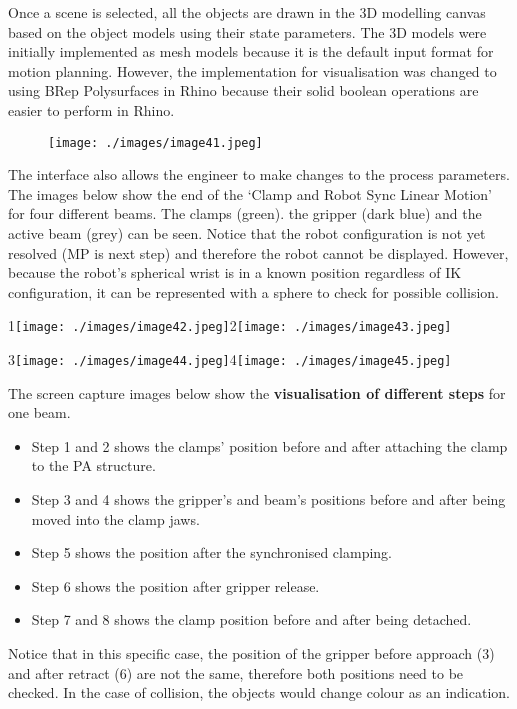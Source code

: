 Once a scene is selected, all the objects are drawn in the 3D modelling canvas based on the object models using their state parameters. The 3D models were initially implemented as mesh models because it is the default input format for motion planning. However, the implementation for visualisation was changed to using BRep Polysurfaces in Rhino because their solid boolean operations are easier to perform in Rhino. 

\begin{figure}[H]
\texttt{[image: ./images/image41.jpeg]}
\end{figure}



The interface also allows the engineer to make changes to the process parameters. The images below show the end of the ‘Clamp and Robot Sync Linear Motion’ for four different beams. The clamps (green). the gripper (dark blue) and the active beam (grey) can be seen. Notice that the robot configuration is not yet resolved (MP is next step) and therefore the robot cannot be displayed. However, because the robot’s spherical wrist is in a known position regardless of IK configuration, it can be represented with a sphere to check for possible collision.

{\small 1\texttt{[image: ./images/image42.jpeg]}2\texttt{[image: ./images/image43.jpeg]}}

{\small 3\texttt{[image: ./images/image44.jpeg]}4\texttt{[image: ./images/image45.jpeg]}}

The screen capture images below show the \textbf{visualisation of different steps }for one beam. 

\begin{itemize}
	\item Step 1 and 2 shows the clamps’ position before and after attaching the clamp to the PA structure. 

	\item Step 3 and 4 shows the gripper’s and beam’s positions before and after being moved into the clamp jaws. 

	\item Step 5 shows the position after the synchronised clamping.

	\item Step 6 shows the position after gripper release. 

	\item Step 7 and 8 shows the clamp position before and after being detached.

\end{itemize}
Notice that in this specific case, the position of the gripper before approach (3) and after retract (6) are not the same, therefore both positions need to be checked. In the case of collision, the objects would change colour as an indication.

